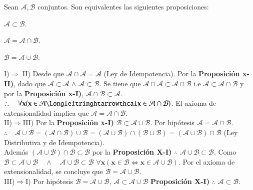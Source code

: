 \begin{proposition}
Sean $\mathcal{A,B}$ conjuntos. Son equivalentes las siguientes proposiciones:
	\begin{iteritem}
	\item $\mathcal{A}\subset\mathcal{B}$.
	\item $\mathcal{A}=\mathcal{A}\cap\mathcal{B}$.
	\item $\mathcal{B}=\mathcal{A}\cup\mathcal{B}$.
	\end{iteritem}
\end{proposition}
\begin{proof2}
I)$\Longrightarrow$ II) Desde que $\mathcal{A}\cap\mathcal{A}=\mathcal{A}$ (Ley de Idempotencia). Por la \textbf{Proposición x-II)}, dado que $\mathcal{A}\subset\mathcal{A}$ $\wedge$ $\mathcal{A}\subset\mathcal{B}$. Se tiene que $\mathcal{A}\cap\mathcal{A}\subset\mathcal{A}\cap\mathcal{B}$ i.e $\mathcal{A}\subset\mathcal{A}\cap\mathcal{B}$ y por la \textbf{Proposición x-I)}, $\mathcal{A}\cap\mathcal{B}\subset\mathcal{A}$. $\therefore \quad \forall\mathbf{x}(\mathbf{x}\in\mathcal{A}\Longleftringhtarrowthcal\mathbf{x}\in\mathcal{A}\cap\mathcal{B})$. El axioma de extensionalidad implica que $\mathcal{A}=\mathcal{A}\cap\mathcal{B}$.\\

II)$\Longrightarrow$III) Por la \textbf{Proposición x-I)} $\mathcal{B}\subset\mathcal{A}\cup\mathcal{B}$. Por hipótesis $\mathcal{A}=\mathcal{A}\cap\mathcal{B}$.\\
	$\therefore\quad\mathcal{A}\cup\mathcal{B}=(\mathcal{A}\cap\mathcal{B})\cup\mathcal{B}=(\mathcal{A}\cup\mathcal{B})\cap(\mathcal{B}\cup\mathcal{B})=(\mathcal{A}\cup\mathcal{B})\cap\mathcal{B}$ (Ley Distributiva y de Idempotencia).\\

Además $(\mathcal{A}\cup\mathcal{B})\cap\mathcal{B}\subset\mathcal{B}$ por la \textbf{Proposición X-I)} $\therefore$ $\mathcal{A}\cup\mathcal{B}\subset\mathcal{B}$. Como $\mathcal{B}\subset\mathcal{A}\cup\mathcal{B}\quad\wedge\quad\mathcal{A}\cup\mathcal{B}\subset\mathcal{B}$ $\forall\mathbf{x}(\mathbf{x}\in\mathcal{B} \Longleftrightarrow \mathbf{x}\in\mathcal{A}\cup\mathcal{B})$. Por el axioma de extensionalidad, se concluye que $\mathcal{B}=\mathcal{A}\cup\mathcal{B}$.\\

	III)$\Longrightarrow$I) Por hipótesis $\mathcal{B}=\mathcal{A}\cup\mathcal{B}$, $\mathcal{A}\subset\mathcal{A}\cup\mathcal{B}$ \textbf{Proposición X-I)} $\therefore$ $\mathcal{A}\subset\mathcal{B}$.\\
\end{proof2}
